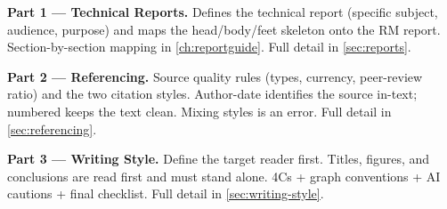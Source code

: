 \documentclass[../main.tex]{subfiles}
\begin{document}
\begin{partbox}\textbf{Part 1 — Technical Reports.} Defines the technical report (specific subject, audience, purpose) and maps the head/body/feet skeleton onto the RM report. Section-by-section mapping in \autoref{ch:reportguide}. Full detail in \autoref{sec:reports}.\end{partbox}

\begin{partbox}\textbf{Part 2 — Referencing.} Source quality rules (types, currency, peer-review ratio) and the two citation styles. Author-date identifies the source in-text; numbered keeps the text clean. Mixing styles is an error. Full detail in \autoref{sec:referencing}.\end{partbox}

\begin{partbox}\textbf{Part 3 — Writing Style.} Define the target reader first. Titles, figures, and conclusions are read first and must stand alone. 4Cs + graph conventions + AI cautions + final checklist. Full detail in \autoref{sec:writing-style}.\end{partbox}
\end{document}
